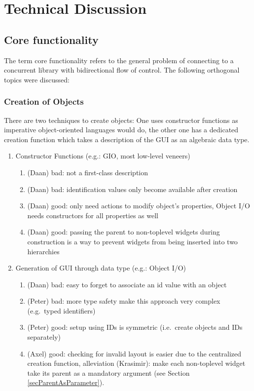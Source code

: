 \documentclass{article}
\begin{document}
\section{Technical Discussion}
\subsection{Core functionality}
The term core functionality refers to the general problem of
connecting to a concurrent library with bidirectional flow of
control. The following orthogonal topics were discussed:

\subsubsection{Creation of Objects}
There are two techniques to create objects: One uses constructor functions as imperative object-oriented languages would do, the other one has a dedicated creation function which takes a description of the GUI as an algebraic data type.
\begin{enumerate}
\item Constructor Functions (e.g.: GIO, most low-level veneers)
  \begin{enumerate}
  \item (Daan) bad: not a first-class description
  \item (Daan) bad: identification values only become available after creation
  \item (Daan) good: only need actions to modify object's properties,
  Object I/O needs constructors for all properties as well
  \item (Daan) good: passing the parent to non-toplevel widgets during
  construction is a way to prevent widgets from being inserted into
  two hierarchies
  \end{enumerate}
\item Generation of GUI through data type (e.g.: Object I/O)
  \begin{enumerate}
  \item (Daan) bad: easy to forget to associate an id value with an object
  \item (Peter) bad: more type safety make this approach very complex
  (e.g.~typed identifiers)
  \item (Peter) good: setup using IDs is symmetric (i.e.~create
  objects and IDs separately)
  \item (Axel) good: checking for invalid layout is easier due to the
  centralized creation function, alleviation (Krasimir): make each
  non-toplevel widget take its parent as a mandatory argument (see
  Section \ref{secParentAsParameter}).
  \end{enumerate}
\end{enumerate}
\end{document}
